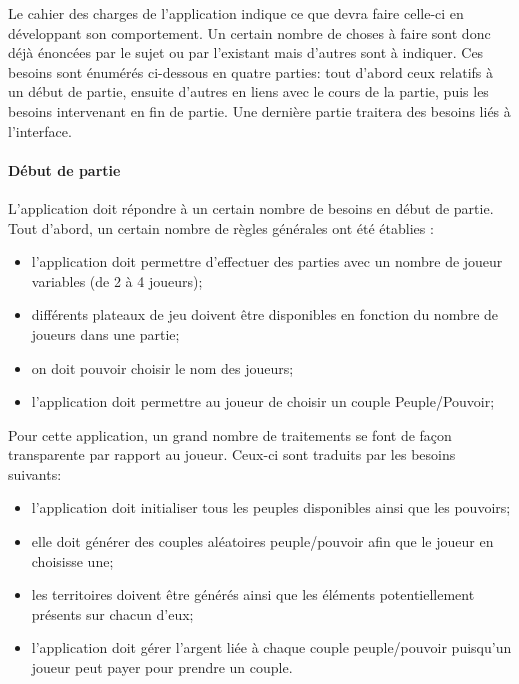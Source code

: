 \documentclass[a4paper, 11pt]{article}
\begin{document}
		Le cahier des charges de l'application indique ce que devra faire celle-ci en développant son comportement. Un certain nombre de choses à faire sont donc déjà énoncées par le sujet ou par l'existant mais d'autres sont à indiquer. Ces besoins sont énumérés ci-dessous en quatre parties: tout d'abord ceux relatifs à un début de partie, ensuite d'autres en liens avec le cours de la partie, puis les besoins intervenant en fin de partie. Une dernière partie traitera des besoins liés à l'interface.
		
			\paragraph{Début de partie\\}
			
			L'application doit répondre à un certain nombre de besoins en début de partie. \\
			
			Tout d'abord, un certain nombre de règles générales ont été établies :
			\begin{itemize}
				\item l'application doit permettre d'effectuer des parties avec un nombre de joueur variables (de 2 à 4 joueurs);
				\item différents plateaux de jeu doivent être disponibles en fonction du nombre de joueurs dans une partie;
				\item on doit pouvoir choisir le nom des joueurs;
				\item l'application doit permettre au joueur de choisir un couple Peuple/Pouvoir; \\
			\end{itemize}
			
			Pour cette application, un grand nombre de traitements se font de façon transparente par rapport au joueur. Ceux-ci sont traduits par les besoins suivants:
			\begin{itemize}
				\item l'application doit initialiser tous les peuples disponibles ainsi que les pouvoirs;
				\item elle doit générer des couples aléatoires peuple/pouvoir afin que le joueur en choisisse une;
				\item les territoires doivent être générés ainsi que les éléments potentiellement présents sur chacun d'eux;
				\item l'application doit gérer l'argent liée à chaque couple peuple/pouvoir puisqu'un joueur peut payer pour prendre un couple.
			\end{itemize}
			
\end{document}
